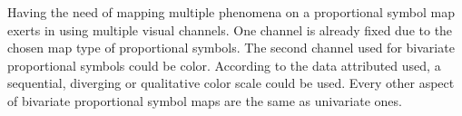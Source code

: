 Having the need of mapping multiple phenomena on a proportional symbol map exerts in using multiple visual channels. One channel is already fixed due to the chosen map type of proportional symbols. The second channel used for bivariate proportional symbols could be color. According to the data attributed used, a sequential, diverging or qualitative color scale could be used. Every other aspect of bivariate proportional symbol maps are the same as univariate ones.